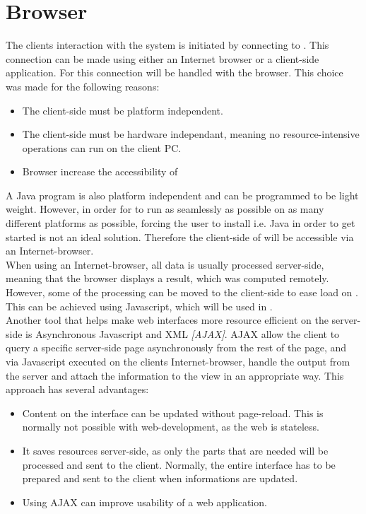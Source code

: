 
\section{Browser}\label{sec:design_client}
The clients interaction with the system is initiated by connecting to .
This connection can be made using either an Internet browser or a client-side application.
For \projectname{} this connection will be handled with the browser.
This choice was made for the following reasons:

\begin{itemize}
	\item The client-side must be platform independent.
	\item The client-side must be hardware independant, meaning no resource-intensive operations can run on the client PC.
	\item Browser increase the accessibility of \projectname{}
\end{itemize}

A Java program is also platform independent and can be programmed to be light weight.
However, in order for \projectname{} to run as seamlessly as possible on as many different platforms as possible, forcing the user to install i.e. Java in order to get started is not an ideal solution.
Therefore the client-side of \projectname{} will be accessible via an Internet-browser. \\

When using an Internet-browser, all data is usually processed server-side, meaning that the browser displays a result, which was computed remotely.
However, some of the processing can be moved to the client-side to ease load on .
This can be achieved using Javascript, which will be used in \projectname{}. \\

Another tool that helps make web interfaces more resource efficient on the server-side is Asynchronous Javascript and XML \emph{[AJAX]}.
AJAX allow the client to query a specific server-side page asynchronously from the rest of the page, and via Javascript executed on the clients Internet-browser, handle the output from the server and attach the information to the view in an appropriate way.
This approach has several advantages:

\begin{itemize}
	\item Content on the interface can be updated without page-reload. This is normally not possible with web-development, as the web is stateless.
	\item It saves resources server-side, as only the parts that are needed will be processed and sent to the client. Normally, the entire interface has to be prepared and sent to the client when informations are updated.
	\item Using AJAX can improve usability of a web application.
\end{itemize}

